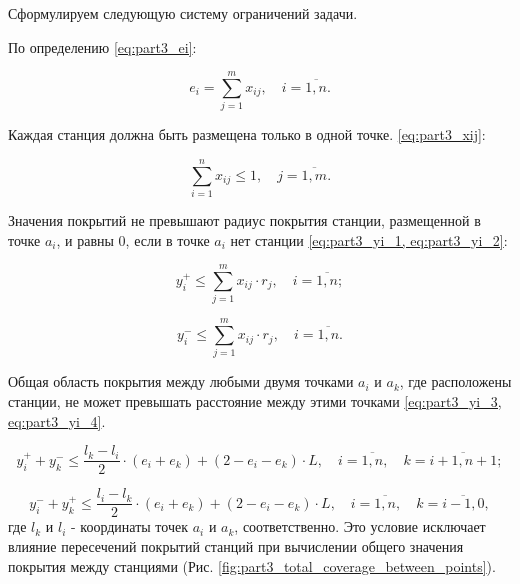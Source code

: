 
Сформулируем следующую систему ограничений задачи.

По определению \cref{eq:part3_ei}:

\begin{equation}
  \label{eq:part3_ei}
  e_i =  \sum\limits_{j=1}^m x_{ij}, \quad i = \overline{1,n}. 
\end{equation}

Каждая станция должна быть размещена только в одной точке. \cref{eq:part3_xij}:

\begin{equation}
  \label{eq:part3_xij}
  \sum\limits_{i=1}^n x_{ij} \leq 1, \quad j = \overline{1,m}. 
\end{equation}

Значения покрытий не превышают радиус покрытия станции, размещенной в точке $ a_i $, и равны 0, если в точке $a_i$  нет станции \cref{eq:part3_yi_1, eq:part3_yi_2}:


\begin{equation}
  \label{eq:part3_yi_1}
  y_i^+ \leq \sum\limits_{j=1}^m x_{ij} \cdot r_j, \quad i = \overline{1,n};
\end{equation}

\begin{equation}
  \label{eq:part3_yi_2}
  y_i^- \leq \sum\limits_{j=1}^m x_{ij} \cdot r_j, \quad i = \overline{1,n}. 
\end{equation}

Общая область покрытия между любыми двумя точками $ a_i $ и $ a_k $, где расположены станции, не может превышать расстояние между этими точками \cref{eq:part3_yi_3, eq:part3_yi_4}.

\begin{equation}
  \label{eq:part3_yi_3}
  y_i^+ + y_k^- \leq \frac{l_k - l_i}{2} \cdot (e_i + e_k ) + (2 - e_i - e_k ) \cdot L, \quad i = \overline{1,n},  \quad k = \overline{i+1,n+1};
\end{equation}

\begin{equation}
  \label{eq:part3_yi_4}
  y_i^- + y_k^+  \leq \frac{l_i-l_k}{2} \cdot (e_i + e_k) + (2 - e_i - e_k) \cdot L, \quad i = \overline{1,n}, \quad k = \overline{i-1,0},
\end{equation}
где $ l_k $ и $ l_i $ - координаты точек $ a_i $ и $ a_k $, соответственно. Это условие исключает влияние пересечений покрытий станций при вычислении общего значения покрытия между станциями (Рис. \cref{fig:part3_total_coverage_between_points}).

